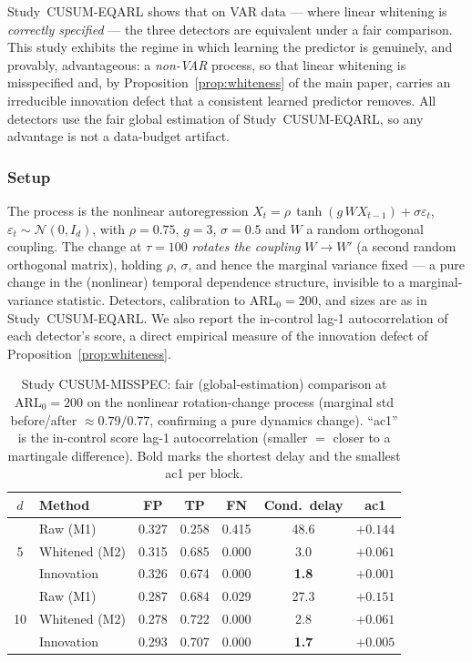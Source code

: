 \documentclass[bj,authoryear]{imsart}
\theoremstyle{plain}
\theoremstyle{definition}
\begin{document}
Study~CUSUM-EQARL shows that on VAR data --- where linear whitening is
\emph{correctly specified} --- the three detectors are equivalent under a
fair comparison.  This study exhibits the regime in which learning the
predictor is genuinely, and provably, advantageous: a \emph{non-VAR}
process, so that linear whitening is misspecified and, by
Proposition~\ref{prop:whiteness} of the main paper, carries an irreducible
innovation defect that a consistent learned predictor removes.  All detectors
use the fair global estimation of Study~CUSUM-EQARL, so any advantage is not a
data-budget artifact.

\subsubsection*{Setup}
The process is the nonlinear autoregression
$X_t = \rho\,\tanh(g\,W X_{t-1}) + \sigma\varepsilon_t$,
$\varepsilon_t\sim\mathcal N(0,I_d)$, with $\rho=0.75$, $g=3$, $\sigma=0.5$
and $W$ a random orthogonal coupling.  The change at $\tau=100$ \emph{rotates
the coupling} $W\to W'$ (a second random orthogonal matrix), holding $\rho$,
$\sigma$, and hence the marginal variance fixed --- a pure change in the
(nonlinear) temporal dependence structure, invisible to a marginal-variance
statistic.  Detectors, calibration to $\mathrm{ARL}_0=200$, and sizes are as
in Study~CUSUM-EQARL.  We also report the in-control lag-1 autocorrelation of
each detector's score, a direct empirical measure of the innovation defect of
Proposition~\ref{prop:whiteness}.

\begin{table}[ht]
\centering
\caption{Study CUSUM-MISSPEC: fair (global-estimation) comparison at
  $\mathrm{ARL}_0=200$ on the nonlinear rotation-change process (marginal std
  before/after $\approx 0.79/0.77$, confirming a pure dynamics change).
  ``ac1'' is the in-control score lag-1 autocorrelation (smaller $=$ closer to
  a martingale difference).  Bold marks the shortest delay and the smallest
  ac1 per block.}
\label{tab:misspec}
\small
\begin{tabular}{clccccc}
\toprule
$d$ & Method & FP & TP & FN & Cond.\ delay & ac1 \\
\midrule
\multirow{3}{*}{5}
  & Raw (M1)      & 0.327 & 0.258 & 0.415 & 48.6 & $+0.144$ \\
  & Whitened (M2) & 0.315 & 0.685 & 0.000 & 3.0  & $+0.061$ \\
  & Innovation    & 0.326 & 0.674 & 0.000 & \textbf{1.8} & \textbf{$+0.001$} \\
\midrule
\multirow{3}{*}{10}
  & Raw (M1)      & 0.287 & 0.684 & 0.029 & 27.3 & $+0.151$ \\
  & Whitened (M2) & 0.278 & 0.722 & 0.000 & 2.8  & $+0.061$ \\
  & Innovation    & 0.293 & 0.707 & 0.000 & \textbf{1.7} & \textbf{$+0.005$} \\
\bottomrule
\end{tabular}
\end{table}
\end{document}
